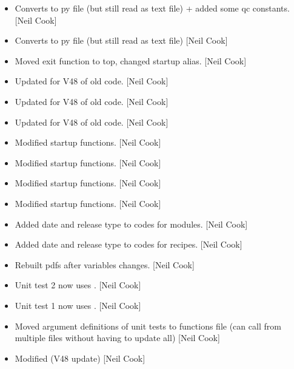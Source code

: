 \documentclass[a4paper,10pt,english]{report}
\begin{document}
\begin{itemize}
\item {} 
Converts to py file (but still read as text file) + added some qc
constants. {[}Neil Cook{]}

\item {} 
Converts to py file (but still read as text file) {[}Neil Cook{]}

\item {} 
Moved exit function to top, changed startup alias. {[}Neil Cook{]}

\item {} 
Updated for V48 of old code. {[}Neil Cook{]}

\item {} 
Updated for V48 of old code. {[}Neil Cook{]}

\item {} 
Updated for V48 of old code. {[}Neil Cook{]}

\item {} 
Modified startup functions. {[}Neil Cook{]}

\item {} 
Modified startup functions. {[}Neil Cook{]}

\item {} 
Modified startup functions. {[}Neil Cook{]}

\item {} 
Modified startup functions. {[}Neil Cook{]}

\item {} 
Added date and release type to codes for modules. {[}Neil Cook{]}

\item {} 
Added date and release type to codes for recipes. {[}Neil Cook{]}

\item {} 
Rebuilt pdfs after variables changes. {[}Neil Cook{]}

\item {} 
Unit test 2 now uses . {[}Neil Cook{]}

\item {} 
Unit test 1 now uses . {[}Neil Cook{]}

\item {} 
Moved argument definitions of unit tests to functions file (can call
from multiple files without having to update all) {[}Neil Cook{]}

\item {} 
Modified  (V48 update) {[}Neil Cook{]}


\end{itemize}
\end{document}
